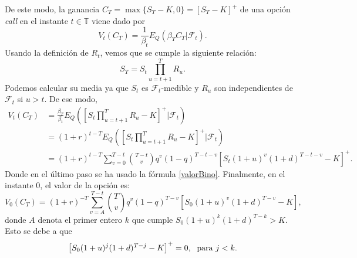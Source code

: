 De este modo, la ganancia $ C_T = \max\{S_T-K, 0\} = \left[S_T - K\right]^+$ de una opción \textit{call} en el instante $ t \in \mathbb{T} $ viene dado por
\[
V_t(C_T) = \frac{1}{\beta_t} E_Q(\beta_T C_T | \mathcal{F}_t).
\]
Usando la definición de $ R_t $, vemos que se cumple la siguiente relación:
\[
S_T = S_t \prod_{u = t+1}^{T}R_u.
\]
Podemos calcular su media ya que $ S_t $ es $ \mathcal{F}_t $-medible y $ R_u $ son independientes de $ \mathcal{F}_t $ si $ u > t $. De ese modo,
\begin{equation*}
\begin{split}
V_t (C_T) &= \frac{\beta_T}{\beta_t}E_Q(\left[S_t\prod_{u=t+1}^{T}R_u - K\right]^+ | \mathcal{F}_t) \\
&= (1+r)^{t-T} E_Q(\left[S_t\prod_{u=t+1}^{T}R_u - K\right]^+| \mathcal{F}_t) \\
& = (1+r)^{t-T} \sum_{v=0}^{T-t}\binom{T-t}{v}q^v(1-q)^{T-t-v}\left[S_t(1+u)^v(1+d)^{T-t-v}-K\right]^+.
\end{split}
\end{equation*}
Donde en el último paso se ha usado la fórmula \eqref{valorBino}. Finalmente, en el instante 0, el valor de la opción es:
\begin{equation*}
V_0(C_T) = (1+r)^{-T} \sum_{v=A}^{T-t}\binom{T}{v}q^v(1-q)^{T-v}\left[S_0(1+u)^v(1+d)^{T-v}-K\right],
\end{equation*}
donde $ A $ denota el primer entero $ k $ que cumple $ S_0(1+u)^k(1+d)^{T-k} > K $. Esto se debe a que \[\left[S_0(1+u)^j(1+d)^{T-j}-K\right]^+ = 0, \hspace{1mm}\text{ para } j<k.\]